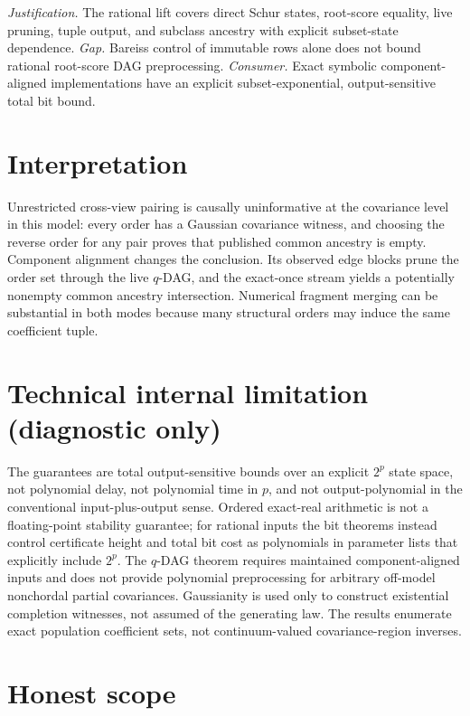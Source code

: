 \documentclass{article}
\begin{document}
\par\smallskip\noindent \textit{Justification.} The rational lift covers direct Schur states, root-score equality, live pruning, tuple output, and subclass ancestry with explicit subset-state dependence. \textit{Gap.} Bareiss control of immutable rows alone does not bound rational root-score DAG preprocessing. \textit{Consumer.} Exact symbolic component-aligned implementations have an explicit subset-exponential, output-sensitive total bit bound.

\section{Interpretation}

Unrestricted cross-view pairing is causally uninformative at the covariance level in this model: every order has a Gaussian covariance witness, and choosing the reverse order for any pair proves that published common ancestry is empty. Component alignment changes the conclusion. Its observed edge blocks prune the order set through the live \(q\)-DAG, and the exact-once stream yields a potentially nonempty common ancestry intersection. Numerical fragment merging can be substantial in both modes because many structural orders may induce the same coefficient tuple.

\section*{Technical internal limitation (diagnostic only)}

The guarantees are total output-sensitive bounds over an explicit \(2^p\) state space, not polynomial delay, not polynomial time in \(p\), and not output-polynomial in the conventional input-plus-output sense. Ordered exact-real arithmetic is not a floating-point stability guarantee; for rational inputs the bit theorems instead control certificate height and total bit cost as polynomials in parameter lists that explicitly include \(2^p\). The \(q\)-DAG theorem requires maintained component-aligned inputs and does not provide polynomial preprocessing for arbitrary off-model nonchordal partial covariances. Gaussianity is used only to construct existential completion witnesses, not assumed of the generating law. The results enumerate exact population coefficient sets, not continuum-valued covariance-region inverses.

\section{Honest scope}
\end{document}
